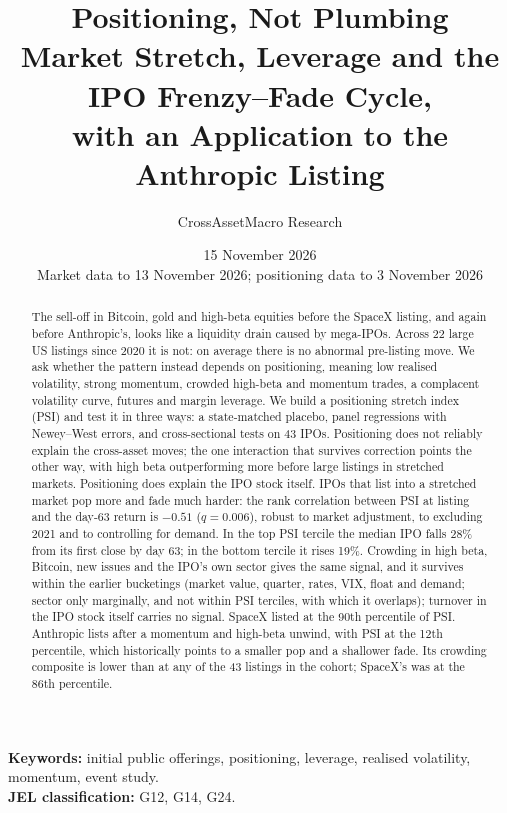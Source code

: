 \documentclass[11pt]{article}
\title{\vspace{-1.2em}\textbf{Positioning, Not Plumbing}\\[0.3em]
\large Market Stretch, Leverage and the IPO Frenzy--Fade Cycle,\\ with an Application to the Anthropic Listing}
\author{CrossAssetMacro Research}
\date{15 November 2026\\[0.2em]\small Market data to 13 November 2026; positioning data to 3 November 2026}
\begin{document}
\maketitle
\thispagestyle{fancy}

\begin{abstract}
\noindent The sell-off in Bitcoin, gold and high-beta equities before the SpaceX listing, and again before Anthropic's, looks like a liquidity drain caused by mega-IPOs. Across 22 large US listings since 2020 it is not: on average there is no abnormal pre-listing move. We ask whether the pattern instead depends on positioning, meaning low realised volatility, strong momentum, crowded high-beta and momentum trades, a complacent volatility curve, futures and margin leverage. We build a positioning stretch index (PSI) and test it in three ways: a state-matched placebo, panel regressions with Newey--West errors, and cross-sectional tests on 43 IPOs. Positioning does not reliably explain the cross-asset moves; the one interaction that survives correction points the other way, with high beta outperforming more before large listings in stretched markets. Positioning does explain the IPO stock itself. IPOs that list into a stretched market pop more and fade much harder: the rank correlation between PSI at listing and the day-63 return is $-0.51$ ($q=0.006$), robust to market adjustment, to excluding 2021 and to controlling for demand. In the top PSI tercile the median IPO falls 28\% from its first close by day 63; in the bottom tercile it rises 19\%. Crowding in high beta, Bitcoin, new issues and the IPO's own sector gives the same signal, and it survives within the earlier bucketings (market value, quarter, rates, VIX, float and demand; sector only marginally, and not within PSI terciles, with which it overlaps); turnover in the IPO stock itself carries no signal. SpaceX listed at the 90th percentile of PSI. Anthropic lists after a momentum and high-beta unwind, with PSI at the 12th percentile, which historically points to a smaller pop and a shallower fade. Its crowding composite is lower than at any of the 43 listings in the cohort; SpaceX's was at the 86th percentile.
\end{abstract}

\noindent\textbf{Keywords:} initial public offerings, positioning, leverage, realised volatility, momentum, event study.\\
\noindent\textbf{JEL classification:} G12, G14, G24.
\end{document}
